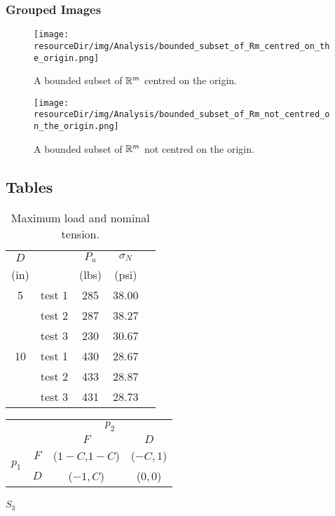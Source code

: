 \documentclass[MathsNotesBase.tex]{subfiles}
\begin{document}
	\subsubsection{Grouped Images}
	\begin{figure}[h!]
		\begin{minipage}{0.9\textwidth} 
			\texttt{[image: \\resourceDir/img/Analysis/bounded\_subset\_of\_Rm\_centred\_on\_the\_origin.png]}    
			\caption{A bounded subset of $\mathbb{R}^{m}$ centred on the origin.}
			\label{fig:label1}  
		\end{minipage}
		
		\vspace{0.75cm}
		\begin{minipage}{0.9\textwidth} 
			\texttt{[image: \\resourceDir/img/Analysis/bounded\_subset\_of\_Rm\_not\_centred\_on\_the\_origin.png]}    
			\caption{A bounded subset of $\mathbb{R}^{m}$ not centred on the origin.}
			\label{fig:label2}   
		\end{minipage}			
	\end{figure}
	
	\subsection{Tables}
	\begin{table}[h!]%
		\caption{Maximum load and nominal tension.}
		\label{aggiungi}\centering%
		\begin{tabular}{clccc}
			\toprule%
			$D$ & & $P_u$ & $\sigma_N$ \\
			(in)& &(lbs) & (psi) \\ \toprule%
			5 & test 1 & 285 & 38.00 \\
			& test 2 & 287 & 38.27 \\
			& test 3 & 230 & 30.67 \\ \midrule
			10 & test 1 & 430 & 28.67 \\
			& test 2 & 433 & 28.87 \\
			& test 3 & 431 & 28.73 \\ \bottomrule
		\end{tabular}
	\end{table}
	
	\begin{tabular}[h!]{*4c}
		& &\multicolumn{2}{c}{$p_{2}$}\\
		& & $F$ &$D$ \\\cline{3-4}
		\multirow{2}{*}{$p_{1}$}& $F$ & \multicolumn{1}{|c|}{($1-C$,$1-C$)} & \multicolumn{1}{c|}{($-C,1$)} \\\cline{3-4}
		& $D$ & \multicolumn{1}{|c|}{($-1,C$)} &\multicolumn{1}{c|}{($0,0$)}\\\cline{3-4}
	\end{tabular}
	\subparagraph{$S_3$}
	
\end{document}
